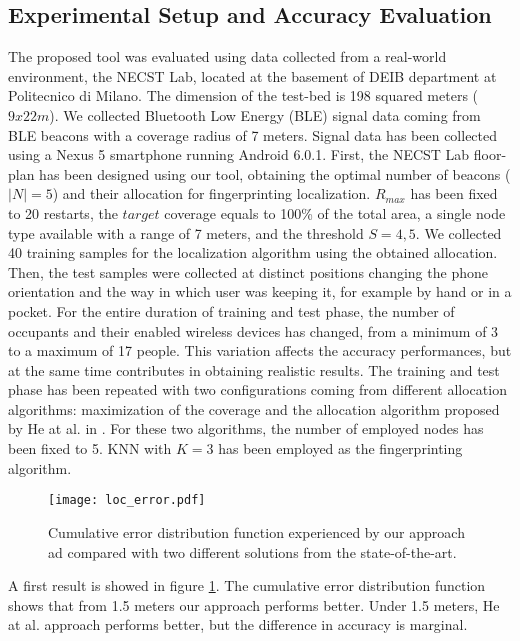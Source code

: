 \subsection{Experimental Setup and Accuracy Evaluation}
The proposed tool was evaluated using data collected from a real-world environment, the NECST Lab, located at the basement of DEIB department at Politecnico di Milano. The dimension of the test-bed is 198 squared meters ($9x22m$). We collected Bluetooth Low Energy (BLE) signal data coming from BLE beacons with a coverage radius of 7 meters. Signal data has been collected using a Nexus 5 smartphone running Android 6.0.1.
First, the NECST Lab floor-plan has been designed using our tool, obtaining the optimal number of beacons ($|N|=5$) and their allocation for fingerprinting localization. $R_{max}$ has been fixed to 20 restarts, the $target$ coverage equals to 100\% of the total area, a single node type available with a range of 7 meters, and the threshold $S=4,5$.
We collected 40 training samples for the localization algorithm using the obtained allocation. Then, the test samples were collected at distinct positions changing the phone orientation and the way in which user was keeping it, for example by hand or in a pocket. For the entire duration of training and test phase, the number of occupants and their enabled wireless devices has changed, from a minimum of 3 to a maximum of 17 people. This variation affects the accuracy performances, but at the same time contributes in obtaining realistic results. The training and test phase has been repeated with two configurations coming from different allocation algorithms: maximization of the coverage \cite{Kouakou2010a} and the allocation algorithm proposed by He at al. in \cite{He2011}. For these two algorithms, the number of employed nodes has been fixed to 5.
KNN with $K=3$ has been employed as the fingerprinting algorithm.

\begin{figure}[h!tb]
\centering\texttt{[image: loc\_error.pdf]}
\caption{Cumulative error distribution function experienced by our approach ad compared with two different solutions from the state-of-the-art.}
\label{fig:loc_error}
\end{figure}

A first result is showed in figure \ref{fig:loc_error}. The cumulative error distribution function shows that from 1.5 meters our approach performs better. Under 1.5 meters, He at al. approach performs better, but the difference in accuracy is marginal.

